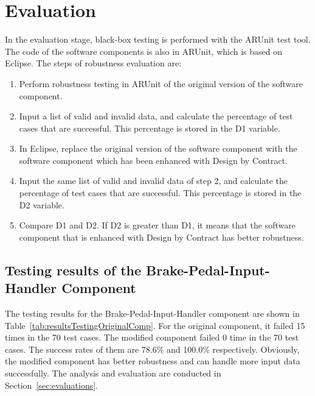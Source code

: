 \section{Evaluation}\label{sec:evaluation}

In the evaluation stage, black-box testing is performed with the ARUnit test tool. The code of the software components is also in ARUnit, which is based on Eclipse. The steps of robustness evaluation are: %

\begin{enumerate}
 \item {Perform robustness testing in ARUnit of the original version of the software component.}
 \item {Input a list of valid and invalid data, and calculate the percentage of test cases that are successful. %
 This percentage is stored in the D1 variable.} %
 \item {In Eclipse, replace the original version of the software component with the software component which has been enhanced with Design by Contract.}
 \item {Input the same list of valid and invalid data of step 2, and calculate the percentage of test cases that are successful. %
  This percentage is stored in the D2 variable.} %
 \item {Compare D1 and D2. If D2 is greater than D1, it means that the software component that is enhanced with Design by Contract has better robustness.}
\end{enumerate}

\subsection{Testing results of the Brake-Pedal-Input-Handler Component}

The testing results for the Brake-Pedal-Input-Handler component are shown in Table~\ref{tab:resultsTestingOriginalComp}. For the original component, it failed 15 times in the 70 test cases.  The modified component failed 0 time in the 70 test cases. The success rates of them are 78.6\% and 100.0\% respectively. Obviously, the modified component has better robustness and can handle more input data successfully. The analysis and evaluation are conducted in Section~\ref{sec:evaluations}.


